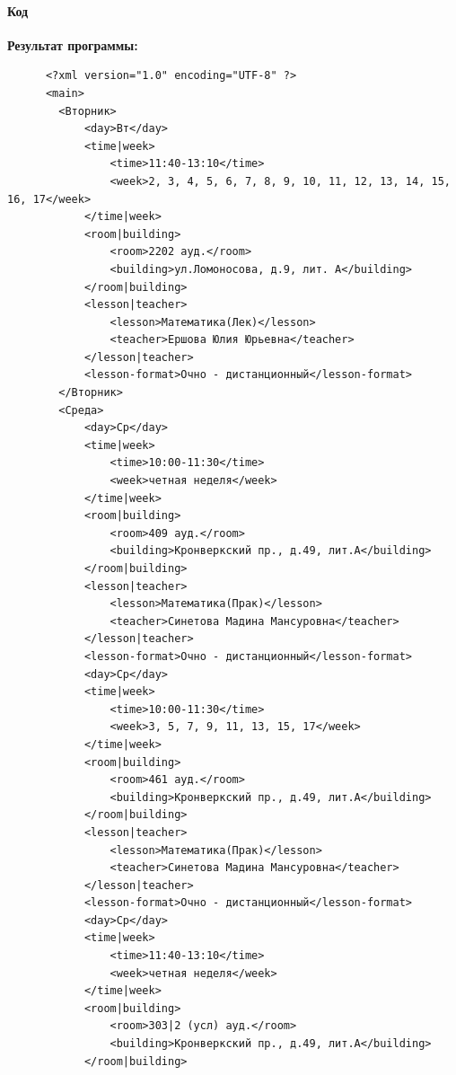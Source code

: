 \documentclass[12pt,onecolumn]{article}
\begin{document}
\begin{flushleft}
\paragraph{Код}
\hfill \break
\FloatBarrier

\hfill \break
\textbf{Результат программы:}\\
\begingroup
    \fontsize{5pt}{7pt}\selectfont
    \begin{verbatim}  
      <?xml version="1.0" encoding="UTF-8" ?>
      <main>
        <Вторник>
            <day>Вт</day>
            <time|week>
                <time>11:40-13:10</time>
                <week>2, 3, 4, 5, 6, 7, 8, 9, 10, 11, 12, 13, 14, 15, 16, 17</week>
            </time|week>
            <room|building>
                <room>2202 ауд.</room>
                <building>ул.Ломоносова, д.9, лит. А</building>
            </room|building>
            <lesson|teacher>
                <lesson>Математика(Лек)</lesson>
                <teacher>Ершова Юлия Юрьевна</teacher>
            </lesson|teacher>
            <lesson-format>Очно - дистанционный</lesson-format>
        </Вторник>
        <Среда>
            <day>Ср</day>
            <time|week>
                <time>10:00-11:30</time>
                <week>четная неделя</week>
            </time|week>
            <room|building>
                <room>409 ауд.</room>
                <building>Кронверкский пр., д.49, лит.А</building>
            </room|building>
            <lesson|teacher>
                <lesson>Математика(Прак)</lesson>
                <teacher>Синетова Мадина Мансуровна</teacher>
            </lesson|teacher>
            <lesson-format>Очно - дистанционный</lesson-format>
            <day>Ср</day>
            <time|week>
                <time>10:00-11:30</time>
                <week>3, 5, 7, 9, 11, 13, 15, 17</week>
            </time|week>
            <room|building>
                <room>461 ауд.</room>
                <building>Кронверкский пр., д.49, лит.А</building>
            </room|building>
            <lesson|teacher>
                <lesson>Математика(Прак)</lesson>
                <teacher>Синетова Мадина Мансуровна</teacher>
            </lesson|teacher>
            <lesson-format>Очно - дистанционный</lesson-format>
            <day>Ср</day>
            <time|week>
                <time>11:40-13:10</time>
                <week>четная неделя</week>
            </time|week>
            <room|building>
                <room>303|2 (усл) ауд.</room>
                <building>Кронверкский пр., д.49, лит.А</building>
            </room|building>

\end{verbatim}
\end{flushleft}
\end{document}
